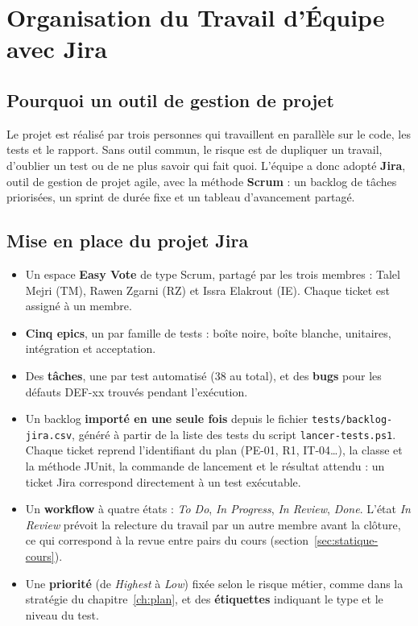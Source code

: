 \documentclass[12pt,a4paper]{report}
\begin{document}
\chapter{Organisation du Travail d'Équipe avec Jira}\label{ch:jira}

\section{Pourquoi un outil de gestion de projet}
Le projet est réalisé par trois personnes qui travaillent en parallèle sur le code, les tests et le rapport. Sans outil commun, le risque est de dupliquer un travail, d'oublier un test ou de ne plus savoir qui fait quoi. L'équipe a donc adopté \textbf{Jira}, outil de gestion de projet agile, avec la méthode \textbf{Scrum} : un backlog de tâches priorisées, un sprint de durée fixe et un tableau d'avancement partagé.

\section{Mise en place du projet Jira}
\begin{itemize}
  \item Un espace \textbf{Easy Vote} de type Scrum, partagé par les trois membres : Talel Mejri (TM), Rawen Zgarni (RZ) et Issra Elakrout (IE). Chaque ticket est assigné à un membre.
  \item \textbf{Cinq epics}, un par famille de tests : boîte noire, boîte blanche, unitaires, intégration et acceptation.
  \item Des \textbf{tâches}, une par test automatisé (38 au total), et des \textbf{bugs} pour les défauts DEF-xx trouvés pendant l'exécution.
  \item Un backlog \textbf{importé en une seule fois} depuis le fichier \texttt{tests/backlog-jira.csv}, généré à partir de la liste des tests du script \texttt{lancer-tests.ps1}. Chaque ticket reprend l'identifiant du plan (PE-01, R1, IT-04\ldots), la classe et la méthode JUnit, la commande de lancement et le résultat attendu : un ticket Jira correspond directement à un test exécutable.
  \item Un \textbf{workflow} à quatre états : \textit{To Do}, \textit{In Progress}, \textit{In Review}, \textit{Done}. L'état \textit{In Review} prévoit la relecture du travail par un autre membre avant la clôture, ce qui correspond à la revue entre pairs du cours (section~\ref{sec:statique-cours}).
  \item Une \textbf{priorité} (de \textit{Highest} à \textit{Low}) fixée selon le risque métier, comme dans la stratégie du chapitre~\ref{ch:plan}, et des \textbf{étiquettes} indiquant le type et le niveau du test.
\end{itemize}
\end{document}
